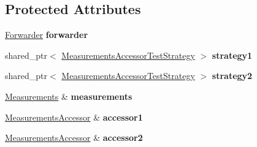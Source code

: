 \subsection*{Protected Attributes}
\begin{DoxyCompactItemize}
\item 
\hyperlink{classnfd_1_1Forwarder}{Forwarder} {\bfseries forwarder}\hypertarget{classnfd_1_1tests_1_1MeasurementsAccessorFixture_a702f47d7dc52b12911b138688f3f8a64}{}\label{classnfd_1_1tests_1_1MeasurementsAccessorFixture_a702f47d7dc52b12911b138688f3f8a64}

\item 
shared\+\_\+ptr$<$ \hyperlink{classnfd_1_1tests_1_1MeasurementsAccessorTestStrategy}{Measurements\+Accessor\+Test\+Strategy} $>$ {\bfseries strategy1}\hypertarget{classnfd_1_1tests_1_1MeasurementsAccessorFixture_a3cc01b754b808c7ef765b4bad86e2749}{}\label{classnfd_1_1tests_1_1MeasurementsAccessorFixture_a3cc01b754b808c7ef765b4bad86e2749}

\item 
shared\+\_\+ptr$<$ \hyperlink{classnfd_1_1tests_1_1MeasurementsAccessorTestStrategy}{Measurements\+Accessor\+Test\+Strategy} $>$ {\bfseries strategy2}\hypertarget{classnfd_1_1tests_1_1MeasurementsAccessorFixture_ad638e45e8ba48c1a51d9c20afc155b64}{}\label{classnfd_1_1tests_1_1MeasurementsAccessorFixture_ad638e45e8ba48c1a51d9c20afc155b64}

\item 
\hyperlink{classnfd_1_1Measurements}{Measurements} \& {\bfseries measurements}\hypertarget{classnfd_1_1tests_1_1MeasurementsAccessorFixture_afa8d203272f79b8a3d9d98854ac78912}{}\label{classnfd_1_1tests_1_1MeasurementsAccessorFixture_afa8d203272f79b8a3d9d98854ac78912}

\item 
\hyperlink{classnfd_1_1MeasurementsAccessor}{Measurements\+Accessor} \& {\bfseries accessor1}\hypertarget{classnfd_1_1tests_1_1MeasurementsAccessorFixture_a2893e69a4fbfa4b93815db5a48f6d851}{}\label{classnfd_1_1tests_1_1MeasurementsAccessorFixture_a2893e69a4fbfa4b93815db5a48f6d851}

\item 
\hyperlink{classnfd_1_1MeasurementsAccessor}{Measurements\+Accessor} \& {\bfseries accessor2}\hypertarget{classnfd_1_1tests_1_1MeasurementsAccessorFixture_a28eda646175b65a93d943616f72287f5}{}\label{classnfd_1_1tests_1_1MeasurementsAccessorFixture_a28eda646175b65a93d943616f72287f5}

\end{DoxyCompactItemize}


